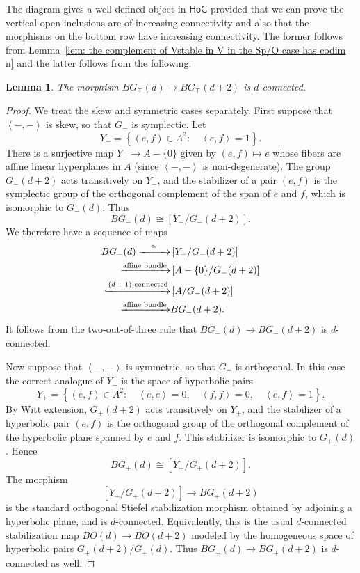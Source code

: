 \message{ !name(Bryan-Vakil.tex)}\documentclass{amsart}
\newtheorem{lemma}[theorem]{Lemma}
\theoremstyle{definition}
\newcommand{\HoG}{\textsf{HoG}}
\begin{document}
The diagram gives a well-defined object in $\HoG$ provided that we can
prove the vertical open inclusions are of increasing connectivity and
also that the morphisms on the bottom row have increasing
connectivity. The former follows from Lemma~\ref{lem: the complement
of Vstable in V in the Sp/O case has codim n} and the latter follows
from the following:
\begin{lemma}
The morphism $BG_{\mp }(d)\to BG_{\mp }(d+2)$ is $d$-connected.
\end{lemma}
\begin{proof}
We treat the skew and symmetric cases separately. First suppose that
$\left\langle -,- \right\rangle$ is skew, so that $G_{-}$ is symplectic.
Let
\[
Y_{-}=\left\{(e,f)\in A^{2}: \quad \left\langle e,f \right\rangle = 1 \right\}.
\]
There is a surjective map $Y_{-}\to A-\{0 \}$ given by $(e,f)\mapsto e$
whose fibers are affine linear hyperplanes in $A$ (since $\left\langle
-,- \right\rangle$ is non-degenerate). The group $G_{-}(d+2)$ acts
transitively on $Y_{-}$, and the stabilizer of a pair $(e,f)$ is the
symplectic group of the orthogonal complement of the span of $e$ and
$f$, which is isomorphic to $G_{-}(d)$. Thus
\[
BG_{-}(d)\cong [Y_{-}/G_{-}(d+2)].
\]
We therefore have a sequence of maps
\begin{align*}
BG_{-}(d)\xrightarrow{\quad \cong\quad  }&
\left[Y_{-}/G_{-}(d+2)\right]\\
\xrightarrow{\text{affine bundle}}&
\left[A-\{0 \} / G_{-}(d+2) \right]\\
\xhookrightarrow{\text{$(d+1)$-connected}}&
\left[A / G_{-}(d+2) \right]\\
\xrightarrow{\text{affine bundle}}&
BG_{-}(d+2).
\end{align*}
It follows from the two-out-of-three rule that $BG_{-}(d)\to
BG_{-}(d+2)$ is $d$-connected.

Now suppose that $\left\langle -,- \right\rangle$ is symmetric, so that
$G_{+}$ is orthogonal. In this case the correct analogue of $Y_{-}$ is
the space of hyperbolic pairs
\[
Y_{+}=\left\{(e,f)\in A^{2}: \quad
\left\langle e,e \right\rangle=0,\quad
\left\langle f,f \right\rangle=0,\quad
\left\langle e,f \right\rangle=1 \right\}.
\]
By Witt extension, $G_{+}(d+2)$ acts transitively on $Y_{+}$, and the
stabilizer of a hyperbolic pair $(e,f)$ is the orthogonal group of the
orthogonal complement of the hyperbolic plane spanned by $e$ and $f$.
This stabilizer is isomorphic to $G_{+}(d)$. Hence
\[
BG_{+}(d)\cong [Y_{+}/G_{+}(d+2)].
\]
The morphism
\[
[Y_{+}/G_{+}(d+2)]\to BG_{+}(d+2)
\]
is the standard orthogonal Stiefel stabilization morphism obtained by
adjoining a hyperbolic plane, and is $d$-connected. Equivalently, this
is the usual $d$-connected stabilization map $BO(d)\to BO(d+2)$ modeled
by the homogeneous space of hyperbolic pairs $G_{+}(d+2)/G_{+}(d)$.
Thus $BG_{+}(d)\to BG_{+}(d+2)$ is $d$-connected as well.
\end{proof}
\end{document}
